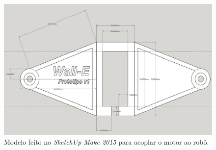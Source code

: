 \begin{figure}[H]
\centering
  \includegraphics[scale=.35]{images/visaoCimaMotorKinect.jpg} 
\caption{\small{Modelo feito no \textit{SketchUp Make 2015} para acoplar o motor ao robô.}}
\label{fig:modeloCimaMotorKinect}
\end{figure} 

